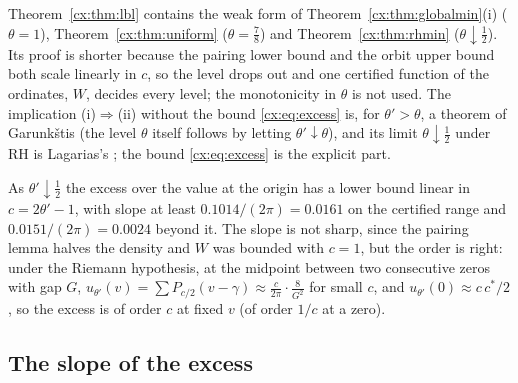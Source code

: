 Theorem~\ref{cx:thm:lbl} contains the weak form of Theorem~\ref{cx:thm:globalmin}(i) ($\theta=1$), Theorem~\ref{cx:thm:uniform} ($\theta=\tfrac78$) and Theorem~\ref{cx:thm:rhmin} ($\theta\downarrow\tfrac12$). Its proof is shorter because the pairing lower bound and the orbit upper bound both scale linearly in $c$, so the level drops out and one certified function of the ordinates, $W$, decides every level; the monotonicity in $\theta$ is not used. The implication (i)$\Rightarrow$(ii) without the bound \eqref{cx:eq:excess} is, for $\theta'>\theta$, a theorem of Garunk\v{s}tis \cite{Garunkstis02} (the level $\theta$ itself follows by letting $\theta'\downarrow\theta$), and its limit $\theta\downarrow\tfrac12$ under RH is Lagarias's \cite{Lagarias}; the bound \eqref{cx:eq:excess} is the explicit part.

As $\theta'\downarrow\tfrac12$ the excess over the value at the origin has a lower bound linear in $c=2\theta'-1$, with slope at least $0.1014/(2\pi)=0.0161$ on the certified range and $0.0151/(2\pi)=0.0024$ beyond it. The slope is not sharp, since the pairing lemma halves the density and $W$ was bounded with $c=1$, but the order is right: under the Riemann hypothesis, at the midpoint between two consecutive zeros with gap $G$, $u_{\theta'}(v)=\sum P_{c/2}(v-\gamma)\approx\frac{c}{2\pi}\cdot\frac{8}{G^2}$ for small $c$, and $u_{\theta'}(0)\approx c\,c^*/2$, so the excess is of order $c$ at fixed $v$ (of order $1/c$ at a zero).

\subsection{The slope of the excess}\label{cx:sec:slope}

